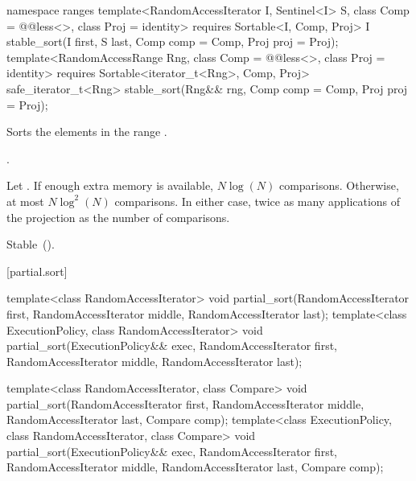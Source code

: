 \begin{addedblock}
%
\begin{itemdecl}
namespace ranges {
  template<RandomAccessIterator I, Sentinel<I> S, class Comp = @@less<>,
      class Proj = identity>
    requires Sortable<I, Comp, Proj>
    I stable_sort(I first, S last, Comp comp = Comp{}, Proj proj = Proj{});
  template<RandomAccessRange Rng, class Comp = @@less<>, class Proj = identity>
    requires Sortable<iterator_t<Rng>, Comp, Proj>
    safe_iterator_t<Rng>
      stable_sort(Rng&& rng, Comp comp = Comp{}, Proj proj = Proj{});
}
\end{itemdecl}

\begin{itemdescr}
\pnum
\effects
Sorts the elements in the range .

\pnum
\returns {}.

\pnum
\complexity
Let .
If enough extra memory is available, $N \log(N)$ comparisons.
Otherwise, at most $N \log^2(N)$ comparisons.
In either case, twice as many applications of the projection as the number of
comparisons.

\pnum
\remarks Stable~().
\end{itemdescr}
\end{addedblock}

[partial.sort]{}

%
\begin{itemdecl}
template<class RandomAccessIterator>
  void partial_sort(RandomAccessIterator first,
                    RandomAccessIterator middle,
                    RandomAccessIterator last);
template<class ExecutionPolicy, class RandomAccessIterator>
  void partial_sort(ExecutionPolicy&& exec,
                    RandomAccessIterator first,
                    RandomAccessIterator middle,
                    RandomAccessIterator last);

template<class RandomAccessIterator, class Compare>
  void partial_sort(RandomAccessIterator first,
                    RandomAccessIterator middle,
                    RandomAccessIterator last,
                    Compare comp);
template<class ExecutionPolicy, class RandomAccessIterator, class Compare>
  void partial_sort(ExecutionPolicy&& exec,
                    RandomAccessIterator first,
                    RandomAccessIterator middle,
                    RandomAccessIterator last,
                    Compare comp);

\end{itemdecl}

